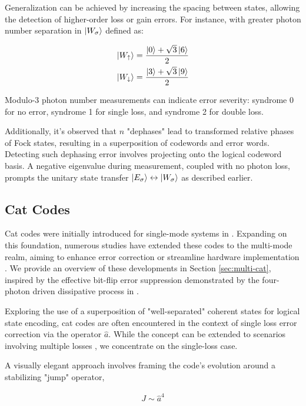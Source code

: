 \documentclass[11pt]{article}
\newcommand\0{\mathbf{0}}
\newcommand\<{\langle}
\renewcommand\>{\rangle}
\begin{document}
Generalization can be achieved by increasing the spacing between states, allowing the detection of higher-order loss or gain errors. For instance, with greater photon number separation in $\ket{W_\sigma}$ defined as:

\[
\begin{aligned}
\ket{W_\uparrow} &= \frac{\ket{0} + \sqrt{3}\ket{6}}{2} \\
\ket{W_\downarrow} &= \frac{\ket{3} + \sqrt{3}\ket{9}}{2}
\end{aligned}
\]

Modulo-3 photon number measurements can indicate error severity: syndrome 0 for no error, syndrome 1 for single loss, and syndrome 2 for double loss.

Additionally, it's observed that $n$ "dephases" lead to transformed relative phases of Fock states, resulting in a superposition of codewords and error words. Detecting such dephasing error involves projecting onto the logical codeword basis. A negative eigenvalue during measurement, coupled with no photon loss, prompts the unitary state transfer $\ket{E_\sigma} \leftrightarrow \ket{W_\sigma}$ as described earlier.

 
\subsection{Cat Codes}

Cat codes were initially introduced for single-mode systems in \cite{cochrane1999macroscopically}. Expanding on this foundation, numerous studies have extended these codes to the multi-mode realm, aiming to enhance error correction or streamline hardware implementation \cite{albert2018multimode, leghtas2013hardware, mirrahimi2014dynamically}. We provide an overview of these developments in Section \ref{sec:multi-cat}, inspired by the effective bit-flip error suppression demonstrated by the four-photon driven dissipative process in \cite{mirrahimi2014dynamically}.

Exploring the use of a superposition of "well-separated" coherent states for logical state encoding, cat codes are often encountered in the context of single loss error correction via the operator $\hat{a}$. While the concept can be extended to scenarios involving multiple losses \cite{albert2018multimode}, we concentrate on the single-loss case.

A visually elegant approach involves framing the code's evolution around a stabilizing "jump" operator,

\begin{align}
\label{eq:single-jump}
J \sim \hat{a}^4	
\end{align}
\end{document}
